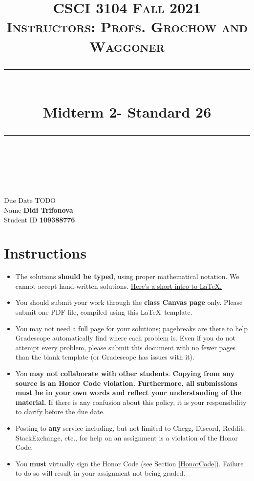 \documentclass[11pt]{article}
\title{
\normalfont \normalsize 
\textsc{CSCI 3104 Fall 2021 \\ 
Instructors: Profs. Grochow and Waggoner} \\
[10pt] 
\rule{\linewidth}{0.5pt} \\[6pt] 
\huge Midterm 2- Standard 26 \\
\rule{\linewidth}{2pt}  \\[10pt]
}
\date{}
\theoremstyle{definition}
\theoremstyle{definition}
\theoremstyle{definition}
\begin{document}

\maketitle


\noindent
Due Date \dotfill TODO \\
Name \dotfill \textbf{Didi Trifonova} \\
Student ID \dotfill \textbf{109388776} \\


\tableofcontents

\section{Instructions}
 \begin{itemize}
	\item The solutions \textbf{should be typed}, using proper mathematical notation. We cannot accept hand-written solutions. \href{http://ece.uprm.edu/~caceros/latex/introduction.pdf}{Here's a short intro to \LaTeX.}
	\item You should submit your work through the \textbf{class Canvas page} only. Please submit one PDF file, compiled using this \LaTeX \ template.
	\item You may not need a full page for your solutions; pagebreaks are there to help Gradescope automatically find where each problem is. Even if you do not attempt every problem, please submit this document with no fewer pages than the blank template (or Gradescope has issues with it).

	\item You \textbf{may not collaborate with other students}. \textbf{Copying from any source is an Honor Code violation. Furthermore, all submissions must be in your own words and reflect your understanding of the material.} If there is any confusion about this policy, it is your responsibility to clarify before the due date. 

	\item Posting to \textbf{any} service including, but not limited to Chegg, Discord, Reddit, StackExchange, etc., for help on an assignment is a violation of the Honor Code.

	\item You \textbf{must} virtually sign the Honor Code (see Section \ref{HonorCode}). Failure to do so will result in your assignment not being graded.
\end{itemize}
\end{document}
